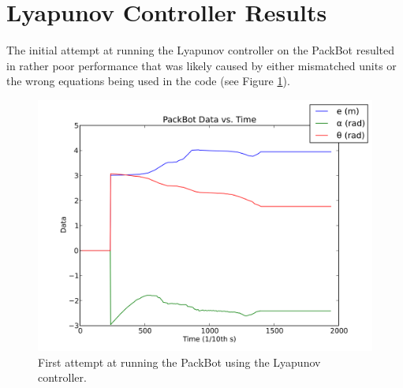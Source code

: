 \section{Lyapunov Controller Results}
\label{sec:lyapunovResults}
The initial attempt at running the Lyapunov controller on the PackBot resulted in rather poor performance that was likely caused by either mismatched units or the wrong equations being used in the code (see Figure \ref{fig:lyapunovDataFirstAttempt}).

\begin{figure}[ht!]
	\centering
	\includegraphics[width=.95\textwidth]{images/pbData}
	\caption{First attempt at running the PackBot using the Lyapunov controller.}
	\label{fig:lyapunovDataFirstAttempt}
\end{figure}